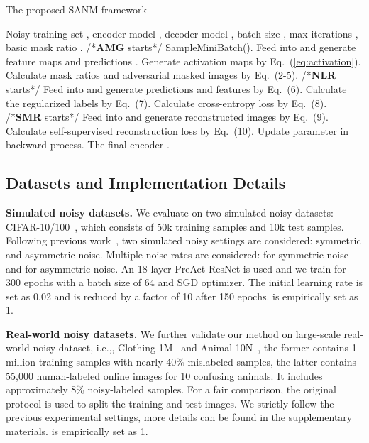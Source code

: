 \documentclass[10pt,twocolumn,letterpaper]{article}
\begin{document}
\begin{algorithm}[!t] 
    \footnotesize
    \caption{The proposed SANM framework}
    \label{alg:dmlp}
    \begin{algorithmic}[1]
    \renewcommand{\algorithmicrequire}{\textbf{Input:}}
    \REQUIRE Noisy training set , encoder model , decoder model , batch size , max iterations , basic mask ratio .
    \renewcommand{\algorithmicrequire}{ \textbf{Procedure:}}
    \REQUIRE
    \STATE /*\textbf{AMG} starts*/
    \STATE   SampleMiniBatch().
    \STATE Feed  into  and generate feature maps  and predictions .
    \STATE Generate activation maps  by Eq.~(\ref{eq:activation}).
    \STATE Calculate mask ratios  and adversarial masked images  by Eq.~(2-5).
    \STATE /*\textbf{NLR} starts*/
    \STATE Feed  into  and generate predictions  and features  by Eq.~(6).
    \STATE Calculate the regularized labels by Eq.~(7).
    \STATE Calculate cross-entropy loss  by Eq.~(8).
    \STATE /*\textbf{SMR} starts*/
    \STATE Feed  into  and generate reconstructed images  by Eq.~(9).
    \STATE Calculate self-supervised reconstruction loss  by Eq.~(10).
    \STATE Update parameter  in backward process.
    \ENDFOR
    \renewcommand{\algorithmicensure}{\textbf{Output:}}
    \ENSURE The final encoder .
    \end{algorithmic}  
    \label{pseudoalgorithm}
     
\end{algorithm}

\subsection{Datasets and Implementation Details}
\textbf{Simulated noisy datasets.} We evaluate on two simulated noisy datasets: CIFAR-10/100~\cite{datasetcifar10}, which consists of 50k training samples and 10k test samples. Following previous work~\cite{li2020dividemix}, two simulated noisy settings are considered: symmetric and asymmetric noise. 
Multiple noise rates are considered:  for symmetric noise and  for asymmetric noise. An 18-layer PreAct ResNet is used and we train for 300 epochs with a batch size of 64 and SGD optimizer. The initial learning rate is set as 0.02 and is reduced by a factor of 10 after 150 epochs.  is empirically set as 1.
\iffalse All the hyper-parameters of DivideMix~\cite{li2020dividemix} and C2D~\cite{zheltonozhskii2022contrast} are set as the authors suggested. \fi

\textbf{Real-world noisy datasets.} We further validate our method on large-scale real-world noisy dataset, i.e.,, Clothing-1M~\cite{Clothing1M} and Animal-10N~\cite{animal_SELFIE}, the former contains 1 million training samples with nearly 40\% mislabeled samples, the latter contains 55,000 human-labeled online images for 10 confusing animals. It includes approximately 8\% noisy-labeled samples.
For a fair comparison, the original protocol is used to split the training and test images. We strictly follow the previous experimental settings, more details can be found in the supplementary materials.  is empirically set as 1.
\end{document}
